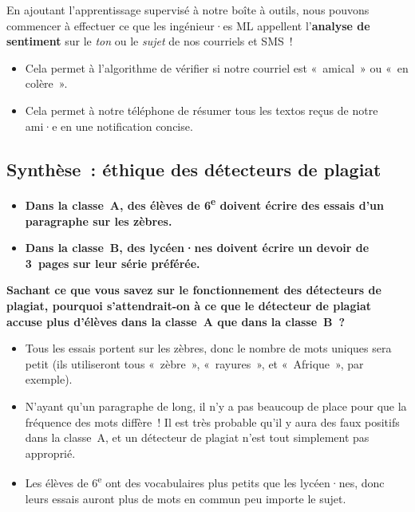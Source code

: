 \documentclass[12pt,a4paper]{article}
\begin{document}
\begin{keypointbox}
  En ajoutant l'apprentissage supervisé à notre boîte à outils, nous pouvons commencer à effectuer ce que les ingénieur·es ML appellent l'\textbf{analyse de sentiment} sur le \emph{ton} ou le \emph{sujet} de nos courriels et SMS~!
  \begin{itemize}
    \item Cela permet à l'algorithme de vérifier si notre courriel est «~amical~» ou «~en colère~».
    \item Cela permet à notre téléphone de résumer tous les textos reçus de notre ami·e en une notification concise.
  \end{itemize}
\end{keypointbox}

\subsection{Synthèse~: éthique des détecteurs de plagiat}

\begin{thinkbox}
  \begin{itemize}
    \item \textbf{Dans la classe~A, des élèves de 6\textsuperscript{e} doivent écrire des essais d'un paragraphe sur les zèbres.}
    \item \textbf{Dans la classe~B, des lycéen·nes doivent écrire un devoir de 3~pages sur leur série préférée.}
  \end{itemize}

  \textbf{Sachant ce que vous savez sur le fonctionnement des détecteurs de plagiat, pourquoi s'attendrait-on à ce que le détecteur de plagiat accuse plus d'élèves dans la classe~A que dans la classe~B~?}

  \begin{itemize}
    \item Tous les essais portent sur les zèbres, donc le nombre de mots uniques sera petit (ils utiliseront tous «~zèbre~», «~rayures~», et «~Afrique~», par exemple).
    \item N'ayant qu'un paragraphe de long, il n'y a pas beaucoup de place pour que la fréquence des mots diffère~! Il est très probable qu'il y aura des faux positifs dans la classe~A, et un détecteur de plagiat n'est tout simplement pas approprié.
    \item Les élèves de 6\textsuperscript{e} ont des vocabulaires plus petits que les lycéen·nes, donc leurs essais auront plus de mots en commun peu importe le sujet.
  \end{itemize}
\end{thinkbox}
\end{document}
